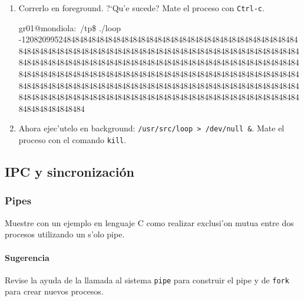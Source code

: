 \begin{enumerate}
\item Correrlo en foreground. ?`Qu'e sucede? Mate el proceso con \texttt{Ctrl-c}.

\begin{envRespuesta}
gr01@mondiola:~/tp\$ ./loop
-120820995248484848484848484848484848484848484848484848484848484848484848484848484848484848484848484848484848484848484848484848484848484848484848484848484848484848484848484848484848484848484848484848484848484848484848484848484848484848484848484848484848484848484848484848484848484848484848484848484848484848484848484848484848484848484848484848484848484848484848484848484848484848484848484848484848484848484848484848484848484
\end{envRespuesta}

\item Ahora ejec'utelo en background: \texttt{/usr/src/loop > /dev/null \&}. Mate el proceso con el comando \texttt{kill}.


\end{enumerate}

\subsection{IPC y sincronizaci\'on}

\subsubsection{Pipes}

Muestre con un ejemplo en lenguaje C como realizar exclusi'on mutua entre dos procesos utilizando un s'olo pipe.

\paragraph{Sugerencia}

Revise la ayuda de la llamada al sistema \texttt{pipe} para construir el pipe y de \texttt{fork} para crear
nuevos procesos.

